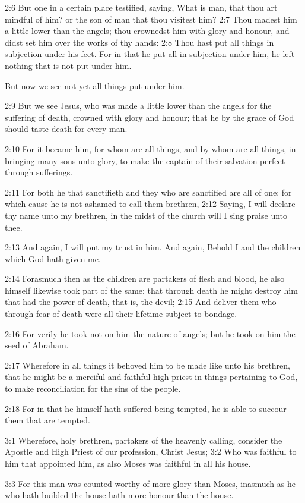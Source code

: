 2:6 But one in a certain place testified, saying, What is man, that thou art mindful of him? or the son of man that thou visitest him?  2:7 Thou madest him a little lower than the angels; thou crownedst him with glory and honour, and didst set him over the works of thy hands: 2:8 Thou hast put all things in subjection under his feet. For in that he put all in subjection under him, he left nothing that is not put under him.

But now we see not yet all things put under him.

2:9 But we see Jesus, who was made a little lower than the angels for the suffering of death, crowned with glory and honour; that he by the grace of God should taste death for every man.

2:10 For it became him, for whom are all things, and by whom are all things, in bringing many sons unto glory, to make the captain of their salvation perfect through sufferings.

2:11 For both he that sanctifieth and they who are sanctified are all of one: for which cause he is not ashamed to call them brethren, 2:12 Saying, I will declare thy name unto my brethren, in the midst of the church will I sing praise unto thee.

2:13 And again, I will put my trust in him. And again, Behold I and the children which God hath given me.

2:14 Forasmuch then as the children are partakers of flesh and blood, he also himself likewise took part of the same; that through death he might destroy him that had the power of death, that is, the devil; 2:15 And deliver them who through fear of death were all their lifetime subject to bondage.

2:16 For verily he took not on him the nature of angels; but he took on him the seed of Abraham.

2:17 Wherefore in all things it behoved him to be made like unto his brethren, that he might be a merciful and faithful high priest in things pertaining to God, to make reconciliation for the sins of the people.

2:18 For in that he himself hath suffered being tempted, he is able to succour them that are tempted.

3:1 Wherefore, holy brethren, partakers of the heavenly calling, consider the Apostle and High Priest of our profession, Christ Jesus; 3:2 Who was faithful to him that appointed him, as also Moses was faithful in all his house.

3:3 For this man was counted worthy of more glory than Moses, inasmuch as he who hath builded the house hath more honour than the house.

